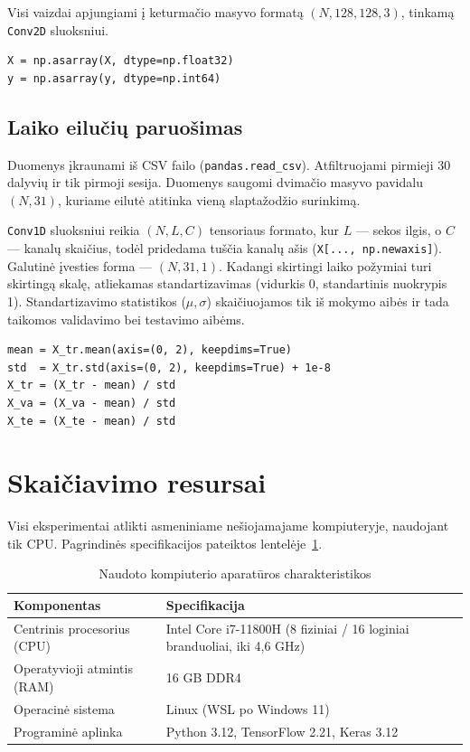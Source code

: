 \documentclass[]{VUMIFTemplateClass}
\begin{document}
Visi vaizdai apjungiami į keturmačio masyvo formatą \((N, 128, 128, 3)\), tinkamą \texttt{Conv2D} sluoksniui.

\begin{verbatim}
X = np.asarray(X, dtype=np.float32)
y = np.asarray(y, dtype=np.int64)
\end{verbatim}

\subsection{Laiko eilučių paruošimas}

Duomenys įkraunami iš CSV failo (\texttt{pandas.read\_csv}). Atfiltruojami pirmieji 30 dalyvių ir tik pirmoji sesija. Duomenys saugomi dvimačio masyvo pavidalu \((N, 31)\), kuriame eilutė atitinka vieną slaptažodžio surinkimą.

\texttt{Conv1D} sluoksniui reikia \((N, L, C)\) tensoriaus formato, kur \(L\) --- sekos ilgis, o \(C\) --- kanalų skaičius, todėl pridedama tuščia kanalų ašis (\texttt{X[..., np.newaxis]}). Galutinė įvesties forma --- \((N, 31, 1)\). Kadangi skirtingi laiko požymiai turi skirtingą skalę, atliekamas standartizavimas (vidurkis 0, standartinis nuokrypis 1). Standartizavimo statistikos (\(\mu, \sigma\)) skaičiuojamos tik iš mokymo aibės ir tada taikomos validavimo bei testavimo aibėms.

\begin{verbatim}
mean = X_tr.mean(axis=(0, 2), keepdims=True)
std  = X_tr.std(axis=(0, 2), keepdims=True) + 1e-8
X_tr = (X_tr - mean) / std
X_va = (X_va - mean) / std
X_te = (X_te - mean) / std
\end{verbatim}


\section{Skaičiavimo resursai}\label{sec:resursai}

Visi eksperimentai atlikti asmeniniame nešiojamajame kompiuteryje, naudojant tik CPU. Pagrindinės specifikacijos pateiktos lentelėje~\ref{tab:hw}.

\begin{table}[H]
    \centering
    \caption{Naudoto kompiuterio aparatūros charakteristikos}
    \label{tab:hw}
    \begin{tabular}{|l|l|}
        \hline
        \textbf{Komponentas} & \textbf{Specifikacija}\\
        \hline
        Centrinis procesorius (CPU) & Intel Core i7-11800H (8 fiziniai / 16 loginiai branduoliai, iki 4{,}6 GHz)\\
        \hline
        Operatyvioji atmintis (RAM) & 16 GB DDR4\\
        \hline
        Operacinė sistema           & Linux (WSL po Windows 11)\\
        \hline
        Programinė aplinka          & Python 3.12, TensorFlow 2.21, Keras 3.12\\
        \hline
    \end{tabular}
\end{table}
\end{document}

